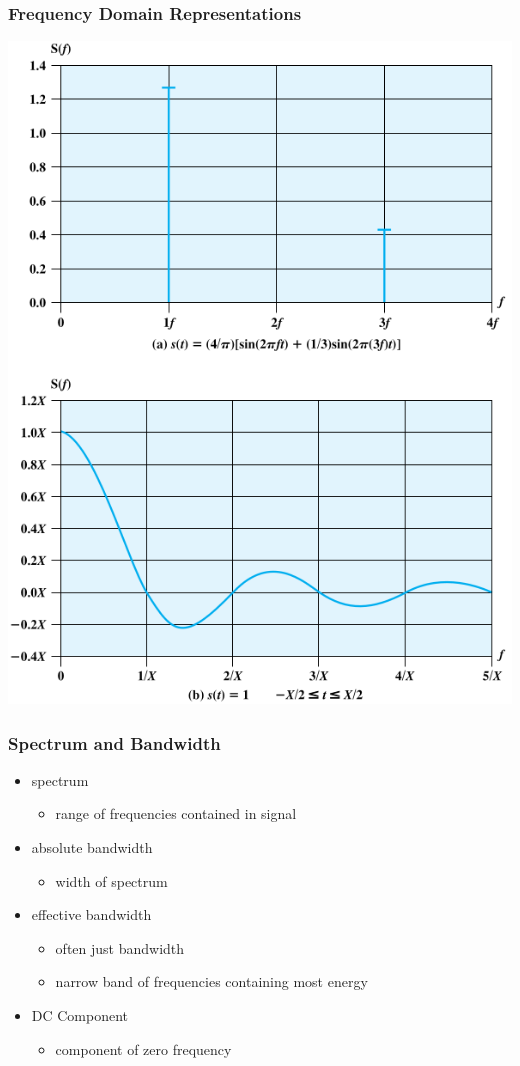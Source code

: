 \documentclass[pdflatex,compress]{beamer}
\begin{document}
\begin{frame}
	\frametitle{Frequency Domain Representations}
	\begin{center}
		\includegraphics[height=0.85\textheight]{img/img05}
	\end{center}
\end{frame}

\begin{frame}
	\frametitle{Spectrum and Bandwidth}
	\begin{itemize}
		\item spectrum
		\begin{itemize}
			\item range of frequencies contained in signal
		\end{itemize}
		\item absolute bandwidth
		\begin{itemize}
			\item width of spectrum
		\end{itemize}
		\item effective bandwidth
		\begin{itemize}
			\item often just bandwidth
			\item narrow band of frequencies containing most energy
		\end{itemize}
		\item DC Component
		\begin{itemize}
			\item component of zero frequency
		\end{itemize}
	\end{itemize}
\end{frame}
\end{document}
